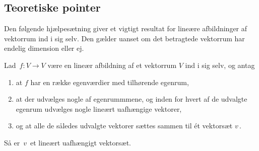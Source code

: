 \subsection{Teoretiske pointer}

Den følgende hjælpesætning giver et vigtigt resultat for lineære afbildninger af vektorrum ind i sig selv. Den gælder uanset om det betragtede vektorrum har endelig dimension eller ej.

\begin{lemma}\label{th.evLinUafh}
Lad $\,f:V\rightarrow V$ være en lineær afbildning af et vektorrum $V$ ind i sig selv, og antag
\begin{enumerate}
\item
at $f$ har en række egenværdier med tilhørende egenrum,
\item
at der udvælges nogle af egenrummmene, og inden for hvert af de udvalgte egenrum udvælges nogle lineært uafhængige vektorer,
\item
og at alle de således udvalgte vektorer sættes sammen til ét vektorsæt $v\,$.
\end{enumerate}
Så er $\,v\,$ et lineært uafhængigt vektorsæt.
\end{lemma}

